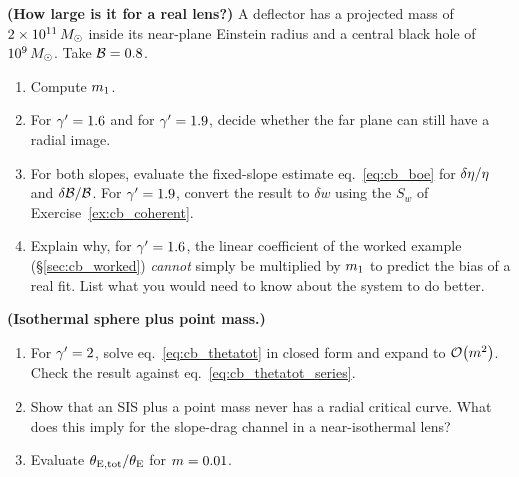 \begin{exercise}
\label{ex:cb_real_system}
\textbf{(How large is it for a real lens?)}
A deflector has a projected mass of $2\times10^{11}\,M_{\odot}$ inside its
near-plane Einstein radius and a central black hole of
$10^{9}\,M_{\odot}$. Take $\mathcal{B}=0.8$.
\begin{enumerate}[label=(\alph*)]
  \item Compute $m_1$.
  \item For $\gamma'=1.6$ and for $\gamma'=1.9$, decide whether the far plane can
        still have a radial image.
  \item For both slopes, evaluate the fixed-slope estimate
        eq.~\eqref{eq:cb_boe} for $\delta\eta/\eta$ and
        $\delta\mathcal{B}/\mathcal{B}$. For $\gamma'=1.9$, convert the result to
        $\delta w$ using the $S_w$ of Exercise~\ref{ex:cb_coherent}.
  \item Explain why, for $\gamma'=1.6$, the linear coefficient of the worked
        example (\S\ref{sec:cb_worked}) \emph{cannot} simply be
        multiplied by $m_1$ to predict the bias of a real fit. List
        what you would need to know about the system to do better.
\end{enumerate}
\end{exercise}

\begin{exercise}
\label{ex:cb_sis_point_mass}
\textbf{(Isothermal sphere plus point mass.)}
\begin{enumerate}[label=(\alph*)]
  \item For $\gamma'=2$, solve eq.~\eqref{eq:cb_thetatot} in closed form and
        expand to $\mathcal{O}\!\left(m^2\right)$. Check the result against
        eq.~\eqref{eq:cb_thetatot_series}.
  \item Show that an SIS plus a point mass never has a radial critical
        curve. What does this imply for the slope-drag channel in a
        near-isothermal lens?
  \item Evaluate $\theta_{\mathrm{E,tot}}/\theta_{\mathrm{E}}$ for $m=0.01$.
\end{enumerate}
\end{exercise}

